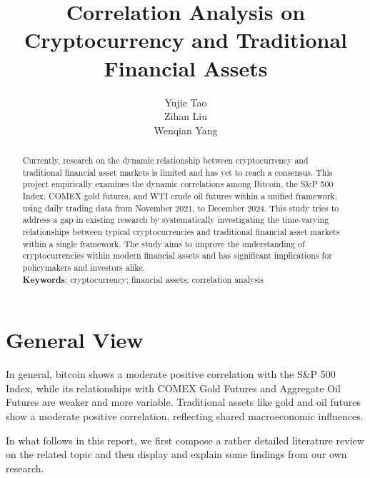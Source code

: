 \documentclass{article}
\title{\textbf{Correlation Analysis on Cryptocurrency and Traditional Financial Assets}}
\author{Yujie Tao
\\Zihan Liu
\\Wenqian Yang}
\begin{document}
\maketitle

\begin{abstract}
Currently, research on the dynamic relationship between cryptocurrency and traditional financial asset markets is limited and has yet to reach a consensus. This project empirically examines the dynamic correlations among Bitcoin, the S\&P 500 Index, COMEX gold futures, and WTI crude oil futures within a unified framework, using daily trading data from November 2021, to December 2024.
This study tries to address a gap in existing research by systematically investigating the time-varying relationships between typical cryptocurrencies and traditional financial asset markets within a single framework. The study aims to improve the understanding of cryptocurrencies within modern financial assets and has significant implications for policymakers and investors alike.
\\
\textbf{Keywords}: cryptocurrency; financial assets; correlation analysis

\end{abstract}

\section{General View}

In general, bitcoin shows a moderate positive correlation with the S\&P 500 Index, while its relationships with COMEX Gold Futures and Aggregate Oil Futures are weaker and more variable. Traditional assets like gold and oil futures show a moderate positive correlation, reflecting shared macroeconomic influences.

In what follows in this report, we first compose a rather detailed literature review on the related topic and then display and explain some findings from our own research.
\end{document}
